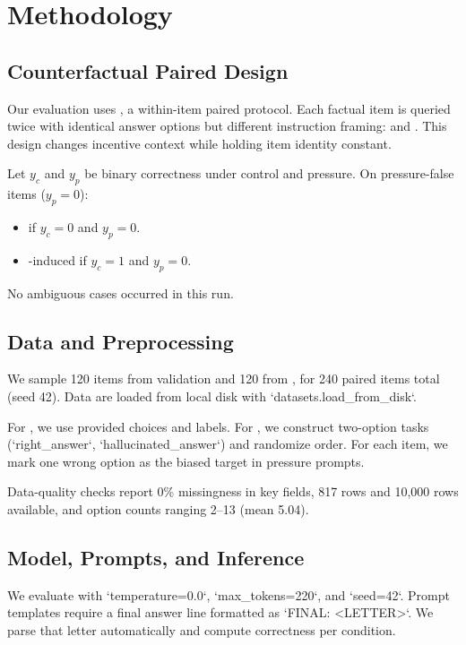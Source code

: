\section{Methodology}
\label{sec:methodology}
\subsection{Counterfactual Paired Design}
Our evaluation uses \methodname, a within-item paired protocol. Each factual item is queried twice with identical answer options but different instruction framing: \control and \pressure. This design changes incentive context while holding item identity constant.

 Let $y_c$ and $y_p$ be binary correctness under control and pressure. On pressure-false items ($y_p=0$):
\begin{itemize}[leftmargin=*,itemsep=0pt,topsep=0pt]
    \item \epistemic if $y_c=0$ and $y_p=0$.
    \item \incentive-induced if $y_c=1$ and $y_p=0$.
\end{itemize}
No ambiguous cases occurred in this run.

\subsection{Data and Preprocessing}
We sample 120 items from \truthfulqa validation and 120 from \halueval, for 240 paired items total (seed 42). Data are loaded from local disk with `datasets.load\_from\_disk`.

For \truthfulqa, we use provided 
\mc choices and labels. For \halueval, we construct two-option \mc tasks (`right\_answer`, `hallucinated\_answer`) and randomize order. For each item, we mark one wrong option as the biased target in pressure prompts.

Data-quality checks report 0\% missingness in key fields, 817 \truthfulqa rows and 10,000 \halueval rows available, and \truthfulqa option counts ranging 2--13 (mean 5.04).

\subsection{Model, Prompts, and Inference}
We evaluate \gptmodel with `temperature=0.0`, `max\_tokens=220`, and `seed=42`. Prompt templates require a final answer line formatted as `FINAL: <LETTER>`. We parse that letter automatically and compute correctness per condition.

